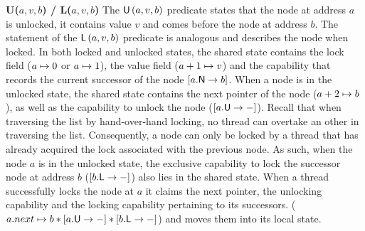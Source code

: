 \noindent\textbf{\textsf{U}($a, v, b$) / \textsf{L}($a, v, b$)} \hspace{0.3cm}
The $\textsf{U}\left(a, v, b\right)$ predicate states that the node at address $a$ is unlocked, it contains value $v$ and comes before the node at address $b$. The statement of the $\textsf{L}\left(a, v, b\right)$ predicate is analogous and describes the node when locked.
In both locked and unlocked states, the shared state contains the lock field ($a \mapsto 0$ or $a \mapsto 1$), the value field ($a+1 \mapsto v$) and the capability that records the current successor of the node $\nextC{a}{b}$.
When a node is in the unlocked state, the shared state contains the next pointer of the node ($a+2 \mapsto b$), as well as the capability to unlock the node ($[\unlockT{a}]$).
Recall that when traversing the list by hand-over-hand locking, no thread can overtake an other in traversing the list. Consequently, a node can only be locked by a thread that has already acquired the lock associated with the previous node. 
As such, when the node $a$ is in the unlocked state, the exclusive capability to lock the successor node at address $b$ ($[\lockT{b}]$) also lies in the shared state.
When a thread successfully locks the node at $a$ it claims the next pointer, the unlocking capability and the locking capability pertaining to its successors. ($\cell{a.next}{b} * [\unlockT{a}] * [\lockT{b}]$) and moves them into its local state.
\\

